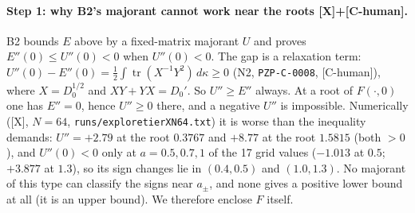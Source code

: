 \documentclass[10pt]{article}
\newcommand{\tier}[1]{\textsf{[#1]}}
\newcommand{\tX}{\tier{X}}
\newcommand{\tCh}{\tier{C-human}}
\renewcommand{\_}{\textunderscore\penalty0\hspace{0pt}}
\newcommand{\tr}{\operatorname{tr}}
\begin{document}
\paragraph{Step 1: why B2's majorant cannot work near the roots \tX{}+\tCh.} B2 bounds $E$ above by a fixed-matrix majorant $U$ and proves $E''(0)\le U''(0)<0$ when $U''(0)<0$.
The gap is a relaxation term: $U''(0)-E''(0)=\tfrac12\int\tr(X^{-1}Y^2)\,d\kappa\ge0$ (N2, \texttt{PZP-C-0008}, \tCh), where $X=D_0^{1/2}$ and $XY+YX=D_0'$. So $U''\ge E''$ always.
At a root of $F(\cdot,0)$ one has $E''=0$, hence $U''\ge0$ there, and a negative $U''$ is impossible. Numerically (\tX, $N=64$, \texttt{runs/explore\_tierX\_N64.txt}) it is worse than the inequality demands:
$U''=+2.79$ at the root $0.3767$ and $+8.77$ at the root $1.5815$ (both $>0$), and $U''(0)<0$ only at $a=0.5,0.7,1$ of the 17 grid values ($-1.013$ at $0.5$; $+3.877$ at $1.3$), so its sign changes lie in $(0.4,0.5)$ and $(1.0,1.3)$.
No majorant of this type can classify the signs near $a_\pm$, and none gives a positive lower bound at all (it is an upper bound). We therefore enclose $F$ itself.
\end{document}

